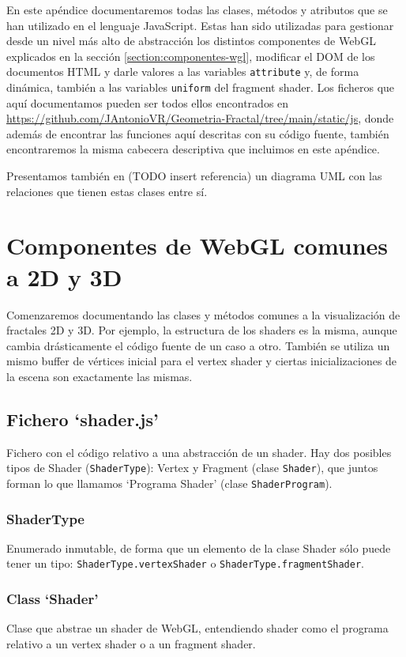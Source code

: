 En este apéndice documentaremos todas las clases, métodos y atributos que se han utilizado en el lenguaje JavaScript. Estas han sido utilizadas para gestionar desde un nivel más alto de abstracción los distintos componentes de WebGL explicados en la sección \ref{section:componentes-wgl}, modificar el DOM de los documentos HTML y darle valores a las variables \verb|attribute| y, de forma dinámica, también a las variables \verb|uniform| del fragment shader. Los ficheros que aquí documentamos pueden ser todos ellos encontrados en \url{https://github.com/JAntonioVR/Geometria-Fractal/tree/main/static/js}, donde además de encontrar las funciones aquí descritas con su código fuente, también encontraremos la misma cabecera descriptiva que incluimos en este apéndice.

Presentamos también en (TODO insert referencia) un diagrama UML con las relaciones que tienen estas clases entre sí.

\section{Componentes de WebGL comunes a 2D y 3D}

Comenzaremos documentando las clases y métodos comunes a la visualización de fractales 2D y 3D. Por ejemplo, la estructura de los shaders es la misma, aunque cambia drásticamente el código fuente de un caso a otro. También se utiliza un mismo buffer de vértices inicial para el vertex shader y ciertas inicializaciones de la escena son exactamente las mismas.

\subsection{Fichero `shader.js'}

Fichero con el código relativo a una abstracción de un shader. Hay dos posibles tipos de Shader (\verb|ShaderType|): Vertex y Fragment (clase \verb|Shader|), que juntos forman lo que llamamos `Programa Shader' (clase \verb|ShaderProgram|).

\subsubsection{ShaderType}

Enumerado inmutable, de forma que un elemento de la clase Shader sólo puede tener un tipo: \verb|ShaderType.vertexShader| o \verb|ShaderType.fragmentShader|.

\subsubsection{Class `Shader'}
Clase que abstrae un shader de WebGL, entendiendo shader como el programa relativo a un vertex shader o a un fragment shader. 

